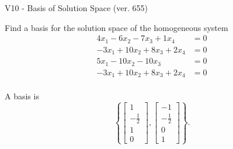\begin{exercise}
  \begin{exerciseTitle}V10 - Basis of Solution Space (ver. 655)\end{exerciseTitle}
  \begin{exerciseStatement}
    Find a basis for the solution space of the homogeneous system 
\begin{align*}
 4 x_ 1 -6 x_ 2 -7 x_ 3 + 1 x_ 4 &= 0  \\ 
  -3 x_ 1 + 10 x_ 2 + 8 x_ 3 + 2 x_ 4 &= 0  \\ 
  5 x_ 1 -10 x_ 2 -10 x_ 3 &= 0  \\ 
  -3 x_ 1 + 10 x_ 2 + 8 x_ 3 + 2 x_ 4 &= 0  \\ 
 \end{align*}


 
  \end{exerciseStatement}

  \begin{exerciseAnswer}
   A basis is   
\[\left\{\left[\begin{array}{c}
1 \\
-\frac{1}{2} \\
1 \\
0
\end{array}\right] , \left[\begin{array}{c}
-1 \\
-\frac{1}{2} \\
0 \\
1
\end{array}\right]\right\}.\]

  


  \end{exerciseAnswer}
\end{exercise}